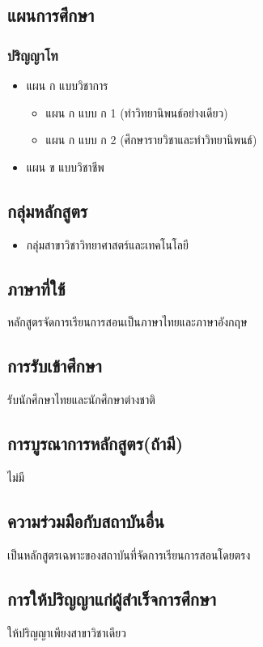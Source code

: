 \subsection{แผนการศึกษา}
\subsubsection*{ปริญญาโท}
\begin{itemize}
	\item แผน ก แบบวิชาการ
		\begin{itemize}
		\item แผน ก แบบ ก 1 (ทำวิทยานิพนธ์อย่างเดียว)
		\item แผน ก แบบ ก 2 (ศึกษารายวิชาและทำวิทยานิพนธ์)
		\end{itemize}
	\item แผน ข แบบวิชาชีพ
\end{itemize}

\subsection{กลุ่มหลักสูตร}
\begin{itemize}
	\item กลุ่มสาขาวิชาวิทยาศาสตร์และเทคโนโลยี
\end{itemize}


\subsection{ภาษาที่ใช้}
หลักสูตรจัดการเรียนการสอนเป็นภาษาไทยและภาษาอังกฤษ

\subsection{การรับเข้าศึกษา}
รับนักศึกษาไทยและนักศึกษาต่างชาติ

\subsection{การบูรณาการหลักสูตร(ถ้ามี)}
ไม่มี

\subsection{ความร่วมมือกับสถาบันอื่น}
เป็นหลักสูตรเฉพาะของสถาบันที่จัดการเรียนการสอนโดยตรง

\subsection{การให้ปริญญาแก่ผู้สำเร็จการศึกษา}
ให้ปริญญาเพียงสาขาวิชาเดียว

